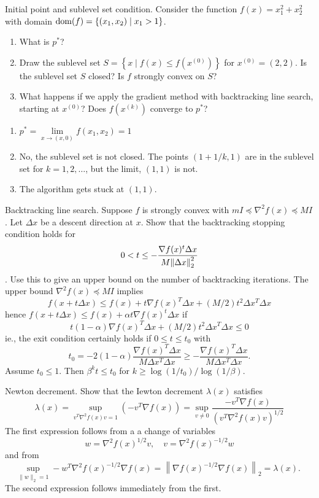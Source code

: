 \begin{problem}[9.3]
    Initial point and sublevel set condition. Consider the function $f(x) = x_1^2 + x_2^2$ with domain $\operatorname{dom}(f) = \left\{(x_1, x_2) \mid x_1 > 1\right\}$.
    \begin{enumerate}
        \item What is $p^*$?
        \item Draw the sublevel set $S = \left\{x \mid f(x) \le f(x^{(0)})\right\}$ for $x^{(0)} = (2, 2)$. Is the sublevel set $S$ closed? Is $f$ strongly convex on $S$?
        \item What happens if we apply the gradient method with backtracking line search, starting at $x^{(0)}$? Does $f(x^{(k)})$ converge to $p^*$?
    \end{enumerate}
    \Answer \text{}\begin{enumerate}
        \item $p^* = \underset{x \to (x, 0)}{\lim}f(x_1, x_2) = 1$
        \item No, the sublevel set is not closed. The points $(1+1/k, 1)$ are in the sublevel set for $k=1,2,\dots$, but the limit, $(1, 1)$ is not.
        \item The algorithm gets stuck at $(1, 1)$.
    \end{enumerate}
\end{problem}

\begin{problem}[9.5]
    Backtracking line search. Suppose $f$ is strongly convex with $mI \preceq \nabla^2 f(x)\preceq MI$. Let $\Delta x$ be a descent direction at $x$. Show that the backtracking stopping condition holds for\[0 < t \le -\frac{\nabla f(x)^t\Delta x}{M\norm{\Delta x}_2^2}\]. Use this to give an upper bound on the number of backtracking iterations.
    \Answer The upper bound $\nabla^2 f(x)\preceq MI$ implies \[f(x+t \Delta x) \leq f(x)+t \nabla f(x)^{T} \Delta x+(M / 2) t^{2} \Delta x^{T} \Delta x\] hence $f(x + t\Delta x) \le f(x) + \alpha t\nabla f(x)^t\Delta x$ if \[t(1-\alpha) \nabla f(x)^{T} \Delta x+(M / 2) t^{2} \Delta x^{T} \Delta x \leq 0\] ie., the exit condition certainly holds if $0 \le t \le t_0$ with\[t_{0}=-2(1-\alpha) \frac{\nabla f(x)^{T} \Delta x}{M \Delta x^{T} \Delta x} \geq-\frac{\nabla f(x)^{T} \Delta x}{M \Delta x^{T} \Delta x} .\] Assume $t_0 \le 1$. Then $\beta^kt\le t_0$ for $k \ge \log(1 / t_0) / \log(1 / \beta)$.
\end{problem}

\begin{problem}[9.9]
    Newton decrement. Show that the Iewton decrement $\lambda(x)$ satisfies\[\lambda(x)=\sup _{v^{T} \nabla^{2} f(x) v=1}\left(-v^{T} \nabla f(x)\right)=\sup _{v \neq 0} \frac{-v^{T} \nabla f(x)}{\left(v^{T} \nabla^{2} f(x) v\right)^{1 / 2}}\]
    \Answer The first expression follows from a a change of variables\[w=\nabla^{2} f(x)^{1 / 2} v, \quad v=\nabla^{2} f(x)^{-1 / 2} w\] and from \[\sup _{\|w\|_{2}=1}-w^{T} \nabla^{2} f(x)^{-1 / 2} \nabla f(x)=\left\|\nabla f(x)^{-1 / 2} \nabla f(x)\right\|_{2}=\lambda(x) \text {. }\] The second expression follows immediately from the first.
\end{problem}

